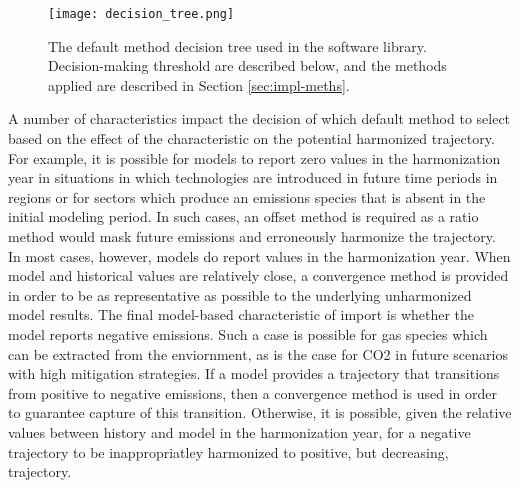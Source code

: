 \begin{figure}
  \begin{center}
    \texttt{[image: decision\_tree.png]}
    \caption[]{
      \label{fig:decision_tree}
      The default method decision tree used in the  software
      library. Decision-making threshold are described below, and the methods
      applied are described in Section \ref{sec:impl-meths}.}
  \end{center}
\end{figure}

A number of characteristics impact the decision of which default method to
select based on the effect of the characteristic on the potential harmonized
trajectory. For example, it is possible for models to report zero values in the
harmonization year in situations in which technologies are introduced in future
time periods in regions or for sectors which produce an emissions species that
is absent in the initial modeling period. In such cases, an offset method is
required as a ratio method would mask future emissions and erroneously harmonize
the trajectory. In most cases, however, models do report values in the
harmonization year. When model and historical values are relatively close, a
convergence method is provided in order to be as representative as possible to
the underlying unharmonized model results. The final model-based characteristic
of import is whether the model reports negative emissions. Such a case is
possible for gas species which can be extracted from the enviornment, as is the
case for CO2 in future scenarios with high mitigation strategies. If a model
provides a trajectory that transitions from positive to negative emissions, then
a convergence method is used in order to guarantee capture of this
transition. Otherwise, it is possible, given the relative values between history
and model in the harmonization year, for a negative trajectory to be
inappropriatley harmonized to positive, but decreasing, trajectory.

